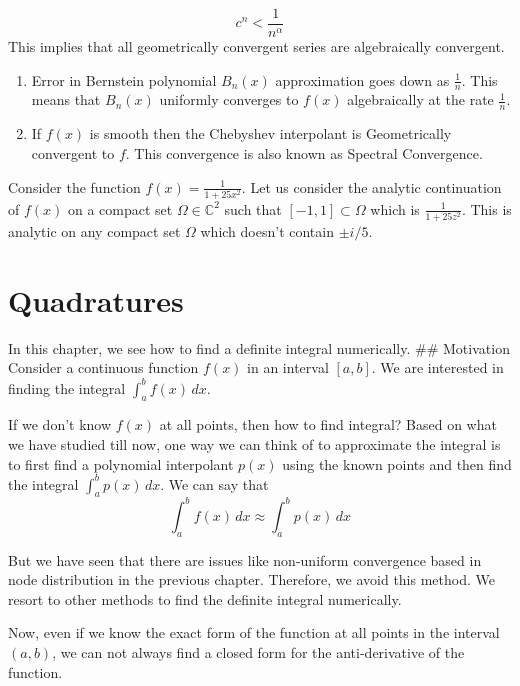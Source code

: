 \documentclass[
]{book}
\begin{document}
\[c^n<\frac{1}{n^{\alpha}}\]
This implies that all geometrically convergent series are algebraically convergent.

\begin{enumerate}
\def\labelenumi{\arabic{enumi}.}
\setcounter{enumi}{3}
\item
  Error in Bernstein polynomial \(B_n(x)\) approximation goes down as \(\frac{1}{n}\). This means that \(B_n(x)\) uniformly converges to \(f(x)\) algebraically at the rate \(\frac{1}{n}\).
\item
  If \(f(x)\) is smooth then the Chebyshev interpolant is Geometrically convergent to \(f\). This convergence is also known as Spectral Convergence.
\end{enumerate}

Consider the function \(f(x) = \frac{1}{1+25x^2}\). Let us consider the analytic continuation of \(f(x)\) on a compact set \(\Omega \in \mathbb{C}^2\) such that \([-1,1] \subset \Omega\) which is \(\frac{1}{1+25z^2}\). This is analytic on any compact set \(\Omega\) which doesn't contain \(\pm i/5\).

\hypertarget{quadratures}{%
\chapter{Quadratures}\label{quadratures}}

In this chapter, we see how to find a definite integral numerically.
\#\# Motivation
Consider a continuous function \(f(x)\) in an interval \([a,b]\). We are interested in finding the integral \(\int_a^b f(x)\, dx\).

If we don't know \(f(x)\) at all points, then how to find integral? Based on what we have studied till now, one way we can think of to approximate the integral is to first find a polynomial interpolant \(p(x)\) using the known points and then find the integral \(\int_a^b p(x) \, dx\). We can say that
\begin{equation}
\int_a^b f(x)\, dx \approx \int_a^b p(x) \, dx
\end{equation}

But we have seen that there are issues like non-uniform convergence based in node distribution in the previous chapter. Therefore, we avoid this method. We resort to other methods to find the definite integral numerically.

Now, even if we know the exact form of the function at all points in the interval \((a,b)\), we can not always find a closed form for the anti-derivative of the function.
\end{document}
